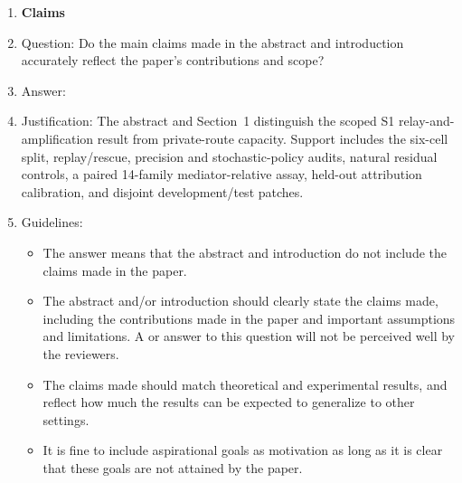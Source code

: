 \documentclass[
]{article}
\begin{document}
\begin{enumerate}

\item {\bf Claims}
    \item[] Question: Do the main claims made in the abstract and introduction accurately reflect the paper's contributions and scope?
    \item[] Answer: \answerYes{} %
    \item[] Justification: The abstract and Section~1 distinguish the scoped S1 relay-and-amplification result from private-route capacity. Support includes the six-cell split, replay/rescue, precision and stochastic-policy audits, natural residual controls, a paired 14-family mediator-relative assay, held-out attribution calibration, and disjoint development/test patches.
    \item[] Guidelines:
    \begin{itemize}
        \item The answer \answerNA{} means that the abstract and introduction do not include the claims made in the paper.
        \item The abstract and/or introduction should clearly state the claims made, including the contributions made in the paper and important assumptions and limitations. A \answerNo{} or \answerNA{} answer to this question will not be perceived well by the reviewers. 
        \item The claims made should match theoretical and experimental results, and reflect how much the results can be expected to generalize to other settings. 
        \item It is fine to include aspirational goals as motivation as long as it is clear that these goals are not attained by the paper. 
    \end{itemize}


\end{enumerate}
\end{document}
